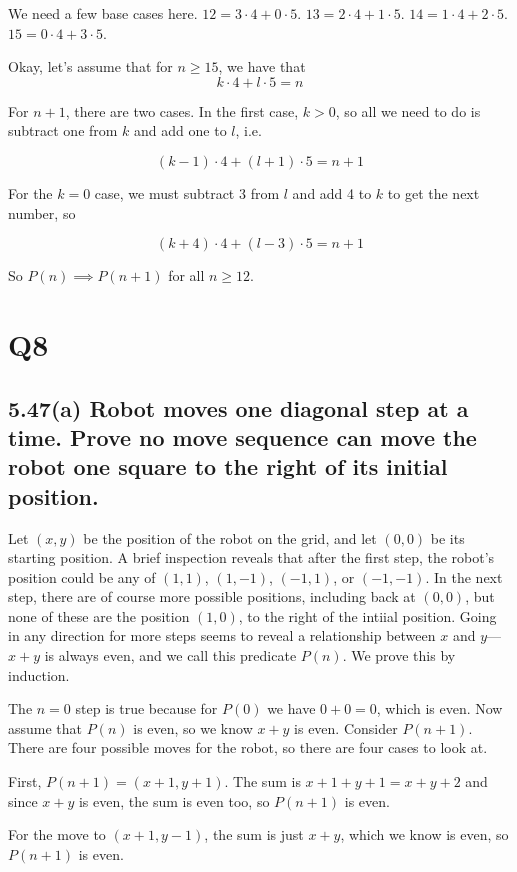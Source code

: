 \documentclass{article}
\begin{document}
We need a few base cases here. $12 = 3\cdot 4 + 0 \cdot 5$. $13 = 2\cdot 4 + 1\cdot 5$. $14 = 1\cdot 4 + 2\cdot 5$. $15 = 0\cdot 4 + 3 \cdot 5$. 

Okay, let's assume that for $n \geq 15$, we have that $$k\cdot4 + l\cdot5 = n$$

For $n+1$, there are two cases. In the first case, $k > 0$, so all we need to do is subtract one from $k$ and add one to $l$, i.e.

$$(k-1)\cdot 4 + (l+1)\cdot 5 = n+1$$

For the $k = 0$ case, we must subtract 3 from $l$ and add 4 to $k$ to get the next number, so

$$(k+4)\cdot 4 + (l-3)\cdot 5 = n + 1$$

So $P(n) \implies P(n+1)$ for all $n \geq 12$.



\section*{Q8} %
\subsection*{5.47(a) \normalsize Robot moves one diagonal step at a time. Prove no move sequence can move the robot one square to the right of its initial position.}

Let $(x,y)$ be the position of the robot on the grid, and let $(0,0)$ be its starting position. A brief inspection reveals that after the first step, the robot's position could be any of $(1,1)$, $(1,-1)$, $(-1,1)$, or $(-1,-1)$. In the next step, there are of course more possible positions, including back at $(0,0)$, but none of these are the position $(1,0)$, to the right of the intiial position. Going in any direction for more steps seems to reveal a relationship between $x$ and $y$---$x+y$ is always even, and we call this predicate $P(n)$. We prove this by induction.

The $n = 0$ step is true because for $P(0)$ we have $0 + 0 = 0$, which is even. Now assume that $P(n)$ is even, so we know $x+y$ is even. Consider $P(n+1)$. There are four possible moves for the robot, so there are four cases to look at.

First, $P(n+1) = (x+1, y+1)$. The sum is $x+1+y+1 = x+y+2$ and since $x+y$ is even, the sum is even too, so $P(n+1)$ is even.

For the move to $(x+1, y-1)$, the sum is just $x+y$, which we know is even, so $P(n+1)$ is even.
\end{document}
